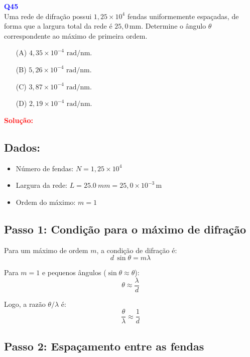 \documentclass[a4paper,12pt]{article}
\begin{document}
\begin{flushleft}
\textbf{\textcolor{blue}{\Large Q45 }}\\
\noindent
Uma rede de difração possui \( 1{,}25 \times 10^{4} \) fendas uniformemente espaçadas, de forma que a largura total da rede é \( 25,0\,\mathrm{mm} \).  
Determine o ângulo \( \theta \) correspondente ao máximo de primeira ordem.

\begin{itemize}
\item[(A)] $4{,}35 \times 10^{-4} \textrm{ rad/nm}$.
\item[(B)] $5{,}26 \times 10^{-4} \textrm{ rad/nm}$.
\item[(C)] $3{,}87 \times 10^{-4} \textrm{ rad/nm}$.
\item[(D)] $2{,}19 \times 10^{-4} \textrm{ rad/nm}$.
\end{itemize}

\vspace{0.5cm}

\textcolor{red}{\textbf{Solução:}}\\

\subsection*{Dados:}
\begin{itemize}
    \item Número de fendas: \( N = 1{,}25 \times 10^4 \)
    \item Largura da rede: \( L = \SI{25,0}{mm} = 25,0 \times 10^{-3}\,\mathrm{m} \)
    \item Ordem do máximo: \( m = 1 \)
\end{itemize}

\subsection*{Passo 1: Condição para o máximo de difração}

Para um máximo de ordem \(m\), a condição de difração é:
\[
d \, \sin\theta = m\lambda
\]

Para \(m=1\) e pequenos ângulos (\( \sin\theta \approx \theta \)):
\[
\theta \approx \frac{\lambda}{d}
\]

Logo, a razão \( \theta/\lambda \) é:
\[
\frac{\theta}{\lambda} \approx \frac{1}{d}
\]

\subsection*{Passo 2: Espaçamento entre as fendas}


\end{flushleft}
\end{document}
